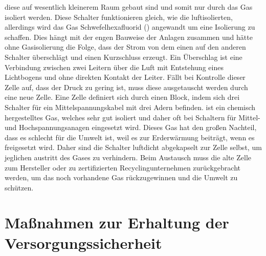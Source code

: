 diese auf wesentlich kleinerem Raum gebaut sind und somit nur durch das Gas isoliert werden. Diese Schalter funktionieren gleich, wie die luftisolierten, 
allerdings wird das Gas Schwefelhexafluorid () angewandt um eine Isolierung zu schaffen. Dies hängt mit der engen Bauweise der Anlagen zusammen und hätte 
ohne Gasisolierung die Folge, dass der Strom von dem einen auf den anderen Schalter überschlägt und einen Kurzschluss erzeugt. Ein Überschlag ist eine 
Verbindung zwischen zwei Leitern über die Luft mit Entstehung eines Lichtbogens und ohne direkten Kontakt der Leiter. Fällt bei Kontrolle dieser  Zelle 
auf, dass der Druck zu gering ist, muss diese ausgetauscht werden durch eine neue Zelle.
Eine Zelle definiert sich durch einen Block, indem sich drei Schalter 
für ein Mittelspannungskabel mit drei Adern befinden.  ist ein chemisch hergestelltes Gas, welches sehr gut isoliert und daher oft bei Schaltern für 
Mittel- und Hochspannungsanagen eingesetzt wird. Dieses Gas hat den großen Nachteil, dass es schlecht für die Umwelt ist, weil es zur Erderwärmung beiträgt, 
wenn es freigesetzt wird. Daher sind die  Schalter luftdicht abgekapselt zur Zelle selbst, um jeglichen austritt des Gases zu verhindern. Beim Austausch 
muss die alte Zelle zum Hersteller oder zu zertifizierten Recyclingunternehmen zurückgebracht werden, um das noch vorhandene Gas rückzugewinnen und die 
Umwelt zu schützen. \autocite{Schwab.2012}
\clearpage

\section{Maßnahmen zur Erhaltung der Versorgungssicherheit}

